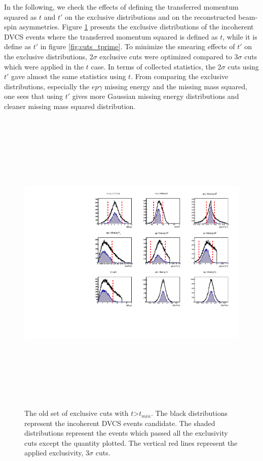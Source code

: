 \documentclass[a4paper,11pt,twoside]{article}
\begin{document}
In the following, we check the effects of defining the transferred momentum 
squared as $t$ and $t'$ on the exclusive distributions and on the reconstructed 
beam-spin asymmetries. Figure \ref{fig:cuts_t} presents the exclusive 
distributions of the incoherent DVCS events where the transferred momentum
squared is defined as $t$, while it is define as $t'$ in figure 
\ref{fig:cuts_tprime}. To minimize the smearing effects of $t'$ on the 
exclusive distributions, 2$\sigma$ exclusive cuts were optimized compared to 
3$\sigma$ cuts which were applied in the $t$ case. In terms of collected 
statistics, the 2$\sigma$ cuts using $t'$ gave almost the same statistics using 
$t$. From comparing the exclusive distributions, especially the $ep\gamma$ 
missing energy and the missing mass squared, one sees that using $t'$ gives 
more Gaussian missing energy distributions and cleaner missing mass squared 
distribution.\\      

\begin{figure}[h!]
\includegraphics[height=15.0cm]{fig/old_all_incoh_exc_cuts.pdf}
\caption{The old set of exclusive cuts with $t$>$t_{min}$. The black
   distributions represent the incoherent DVCS events candidate. The shaded
   distributions represent the events which passed all the exclusivity cuts
   except the quantity plotted. The vertical red lines represent the applied
exclusivity, 3$\sigma$ cuts.}
\label{fig:cuts_t}
\end{figure}
\end{document}
